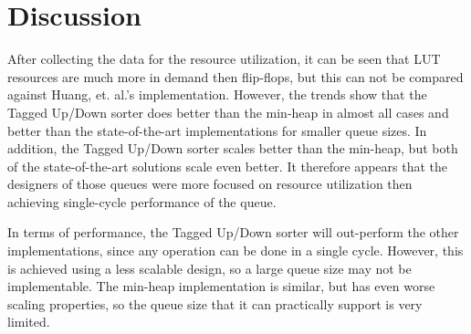 \section{Discussion}
\label{sec:discussion}

After collecting the data for the resource utilization, it can be seen that LUT resources are much more in demand then flip-flops, but this can not be compared against Huang, et. al.'s implementation. However, the trends show that the Tagged Up/Down sorter does better than the min-heap in almost all cases and better than the state-of-the-art implementations for smaller queue sizes. In addition, the Tagged Up/Down sorter scales better than the min-heap, but both of the state-of-the-art solutions scale even better. It therefore appears that the designers of those queues were more focused on resource utilization then achieving single-cycle performance of the queue.

In terms of performance, the Tagged Up/Down sorter will out-perform the other implementations, since any operation can be done in a single cycle. However, this is achieved using a less scalable design, so a large queue size may not be implementable. The min-heap implementation is similar, but has even worse scaling properties, so the queue size that it can practically support is very limited.